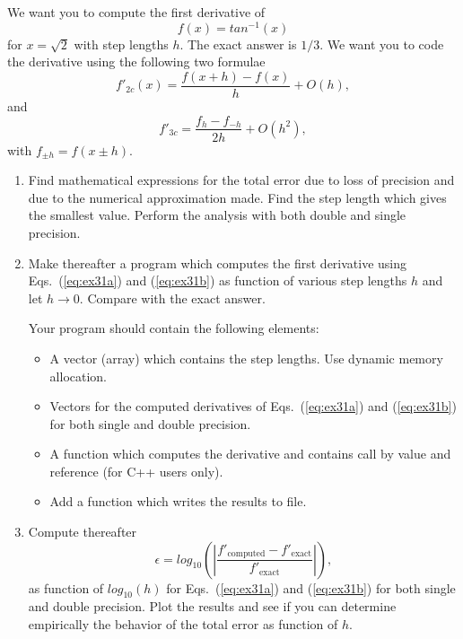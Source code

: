 \documentclass[10pt,a4paper,english,fleqn]{report}
\begin{document}
We want you to compute the first derivative of
\[
   f(x)=tan^{-1}(x) 
\]
for $x=\sqrt{2}$ with step lengths $h$. 
The exact answer is
$1/3$.
We want you to code the derivative using the following two
formulae 
\begin{equation}
    f'_{2c}(x)= \frac{f(x+h)-f(x)}{h}+O(h),
\label{eq:ex31a}
\end{equation}
and 
\begin{equation} 
   f'_{3c}=\frac{f_h-f_{-h}}{2h}+O(h^2),
\label{eq:ex31b}
\end{equation}
with $f_{\pm h}=f(x\pm h)$.



\begin{enumerate}
\item Find mathematical expressions for the total error due to loss
of precision and due to the numerical approximation made.
Find the step length which gives the smallest value.
Perform the analysis with both double and single precision.

\item Make thereafter a program 
which computes the first derivative using Eqs.~(\ref{eq:ex31a}) and (\ref{eq:ex31b}) 
as function of various step lengths $h$ and let $h\rightarrow 0$.
Compare with the exact answer.

Your program should contain the following elements:  
\begin{itemize}
 \item A vector (array)  which contains the step lengths. 
Use dynamic memory allocation.
 \item Vectors for the computed derivatives of Eqs.~(\ref{eq:ex31a}) and (\ref{eq:ex31b}) 
for both single and double precision.
\item A function which computes the derivative and contains call by value and reference 
(for C++ users only).

 \item Add a function which writes the results to file.
\end{itemize}
\item Compute thereafter
\[
   \epsilon=log_{10}\left(\left|\frac{f'_{\mathrm{computed}}-f'_{\mathrm{exact}}}
                 {f'_{\mathrm{exact}}}\right|\right),
\]
as function of  $log_{10}(h)$ for Eqs.~(\ref{eq:ex31a}) and (\ref{eq:ex31b})  
for both single and double precision.
Plot the results and see if you can determine empirically 
the behavior of the total error as function of $h$.
\end{enumerate}
\end{document}
